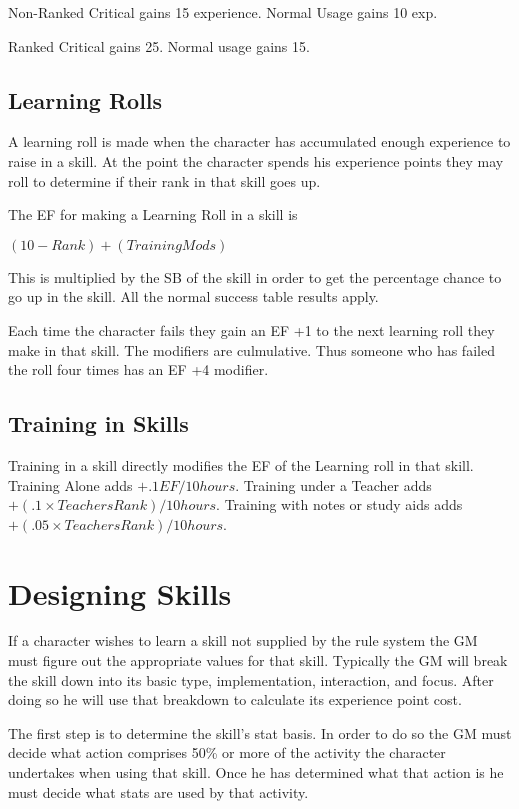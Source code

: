 \begin{relate}
	\item[Non-Ranked] Critical gains 15 experience. Normal Usage gains 10 exp.
	\item[Ranked] Critical gains 25. Normal usage gains 15.
\end{relate}

\subsection{Learning Rolls}

A learning roll is made when the character has accumulated enough
experience to raise in a skill. At the point the character spends 
his experience points they may roll to determine if their rank in that
skill goes up.
 
The EF for making a Learning Roll in a skill is 

\((10 - Rank) + ({Training Mods})\)

This is multiplied by the SB of the skill in order to get the
percentage chance to go up in the skill. All the normal success table 
results apply.

Each time the character fails they gain an EF +1 to the next learning
roll they make in that skill. The modifiers are culmulative. Thus
someone who has failed the roll four times has an EF +4 modifier.

\subsection{Training in Skills}

Training in a skill directly modifies the EF of the Learning roll in
that skill. Training Alone adds \(+.1 EF/10 hours\). Training under a
Teacher adds \(+(.1 \times {Teachers Rank})/10 hours\). Training with
notes or study aids adds \(+(.05 \times {Teachers Rank})/10 hours\).

\section{Designing Skills}

If a character wishes to learn a skill not supplied by the rule 
system the GM must figure out the appropriate values for that skill. 
Typically the GM will break the skill down into its basic type, 
implementation, interaction, and focus. After doing so he will use 
that breakdown to calculate its experience point cost.

The first step is to determine the skill's stat basis. In order to do 
so the GM must decide what action comprises 50\% or more of the activity
the character undertakes when using that skill. Once he has determined 
what that action is he must decide what stats are used by that activity.

